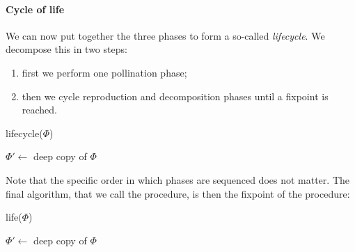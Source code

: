 \begin{procedure}[H]
\paragraph{Cycle of life}

We can now put together the three phases to form a so-called \emph{lifecycle}.
We decompose this in two steps:
\begin{enumerate}
  \item first we perform one pollination phase;
  \item then we cycle reproduction and decomposition phases until a fixpoint is
  reached.
\end{enumerate}

\begin{procedure}[H]
  \caption{lifecycle($\Phi$)}
  \BlankLine

  \pollination{$\Phi$}\;

  $\Phi' \longleftarrow $ deep copy of $\Phi$\;
  \;
  \;
\end{procedure}

Note that the specific order in which phases are sequenced does not matter. The
final algorithm, that we call the  procedure, is then the fixpoint
of the  procedure:

\begin{procedure}[H]
  \caption{life($\Phi$)}
  \BlankLine

  $\Phi' \longleftarrow $ deep copy of $\Phi$\;
  \;
\end{procedure}


\end{procedure}
